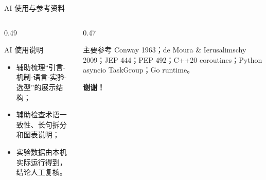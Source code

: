 \documentclass[UTF8,aspectratio=169,11pt]{ctexbeamer}
\begin{document}
\begin{frame}{AI 使用与参考资料}
  \begin{columns}[T,totalwidth=\linewidth]
    \begin{column}{0.49\linewidth}
      \begin{block}{AI 使用说明}
        \begin{itemize}
          \item 辅助梳理“引言-机制-语言-实验-选型”的展示结构；
          \item 辅助检查术语一致性、长句拆分和图表说明；
          \item 实验数据由本机实际运行得到，结论人工复核。
        \end{itemize}
      \end{block}
    \end{column}
    \begin{column}{0.47\linewidth}
      \begin{exampleblock}{主要参考}
        Conway 1963；de Moura \& Ierusalimschy 2009；JEP 444；PEP 492；C++20 coroutines；Python asyncio TaskGroup；Go runtime。
      \end{exampleblock}
      \vspace{0.35cm}
      \centering
      {\Huge\bfseries 谢谢！\par}
    \end{column}
  \end{columns}
\end{frame}
\end{document}
